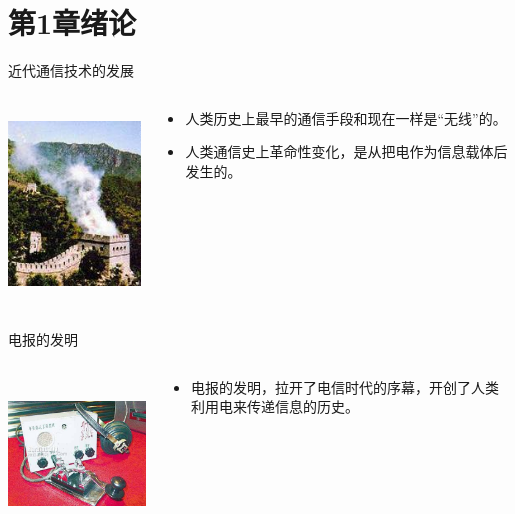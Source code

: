 \section{第1章\quad 绪论}

\begin{frame}{近代通信技术的发展}
 \begin{columns}
  \begin{column}{0.35\linewidth}
   \centering
   \includegraphics[height=5cm]{Cha1//fenghuotai2.jpg}
  \end{column}
  \begin{column}{0.65\linewidth}
   \centering
   \begin{itemize}
    \item 人类历史上最早的通信手段和现在一样是“无线”的。
    \item 人类通信史上革命性变化，是从把电作为信息载体后发生的。
   \end{itemize}
  \end{column}
 \end{columns}
\end{frame}

\begin{frame}{电报的发明}
 \begin{columns}
  \begin{column}{0.5\linewidth}
   \includegraphics[height=4cm]{Cha1//dianbao}
  \end{column}
  \begin{column}{0.5\linewidth}
   \begin{itemize}
    \item 电报的发明，拉开了电信时代的序幕，开创了人类利用电来传递信息的历史。
   \end{itemize}
  \end{column}
 \end{columns}
\end{frame}

